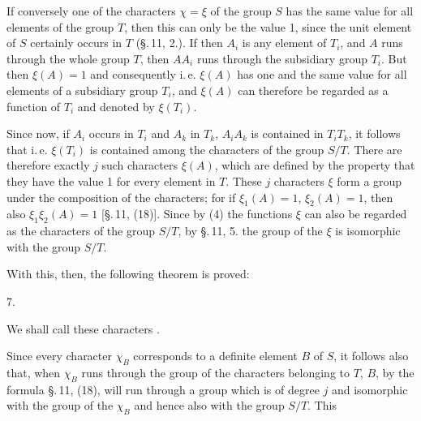 
If conversely one of the characters $\chi = \xi$ of the group $S$
has the same value for all elements of the group $T$, then this
can only be the value 1, since the unit element of $S$ certainly
occurs in $T$ (\S.\,11, 2.). If then $A_i$ is any element
of $T_i$, and $A$ runs through the whole group $T$, then
$AA_i$ runs through the subsidiary group $T_i$. But then
$\xi(A) = 1$ and consequently
i.\,e. $\xi(A)$ has one and the same value for all elements of a
subsidiary group $T_i$, and $\xi(A)$ can therefore be regarded as a
function of $T_i$ and denoted by $\xi(T_i)$.

Since now, if $A_i$ occurs in $T_i$ and $A_k$ in $T_k$, $A_iA_k$
is contained in $T_iT_k$, it follows that
i.\,e. $\xi(T_i)$ is contained among the characters of the group
$S/T$. There are therefore exactly $j$ such characters $\xi(A)$,
which are defined by the property that they have the value 1 for
every element in $T$. These $j$ characters $\xi$ form a group under
the composition of the characters; for if $\xi_1(A) = 1$,
$\xi_2(A) = 1$, then also $\xi_1\xi_2(A) = 1$ [\S.\,11, (18)].
Since by (4) the functions $\xi$ can also be regarded as the
characters of the group $S/T$, by \S.\,11, 5. the group of the
$\xi$ is isomorphic with the group $S/T$.

With this, then, the following theorem is proved:

7.\ 

We shall call these characters .

Since every character $\chi_B$ corresponds to a definite element $B$ of $S$,
it follows also that, when $\chi_B$ runs through the group of the
characters belonging to $T$, $B$, by the formula \S.\,11, (18),
will run through a group which is of degree $j$ and isomorphic with the
group of the $\chi_B$ and hence also with the group $S/T$. This
